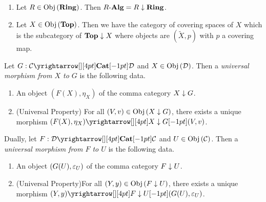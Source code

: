 \begin{eg}
  \begin{enumerate}
    \item Let $R\in\obj{\RING}$. Then $\ALG[R] = R\darrow\RING$.
    \item Let $X\in\obj{\TOP}$. Then we have the category of covering spaces 
    of $X$ which is the subcategory of $\TOP\darrow X$ where 
    objects are $(\tilde{X},p)$ with $p$ a covering map.
  \end{enumerate}
\end{eg}

\begin{dfn}\hypertarget{universal}{}
  
  Let $G : \map{\CC}{\DD}{\CAT}{}$ and $X \in \obj{\DD}$.
  Then a \emph{universal morphism from $X$ to $G$} is the following data. 
  \begin{enumerate}
    \item An object $(F(X),\eta_X)$ of the comma category $X\darrow G$.
    \item (Universal Property) For all $(V,v) \in \obj{X\darrow G}$,
    there exists a unique morphism $\map{(F(X),\eta_X)}{(V,v)}{X\darrow G}{}$.
  \end{enumerate}

  Dually, let $F : \map{\DD}{\CC}{\CAT}{}$ and $U \in \obj{\CC}$.
  Then a \emph{universal morphism from $F$ to $U$} is the following data. 
  \begin{enumerate}
    \item An object $(G(U),\ep_U)$ of the comma category $F\darrow U$.
    \item (Universal Property)For all $(Y,y) \in \obj{F\darrow U}$,
    there exists a unique morphism $\map{(Y,y)}{(G(U),\ep_U)}{F\darrow U}{}$.
  \end{enumerate}
\end{dfn}

